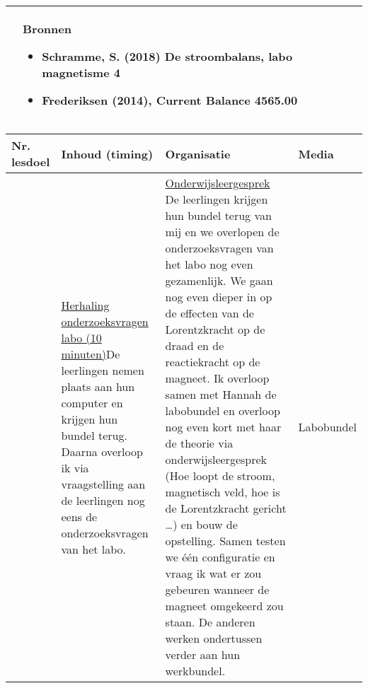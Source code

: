 \begin{landscape}
\begin{tabularx}{1.56\textwidth}{|p{}|X|}
		\\ \cline{2-2}
		  & \textbf{Bronnen}\begin{itemize}
		  	\item Schramme, S. (2018) De stroombalans, labo magnetisme 4
		  	\item Frederiksen (2014), Current Balance 4565.00
		  \end{itemize}\\ \hline
	\end{tabularx}


\newpage
	
	\begin{tabularx}{1.56\textwidth}{|p{1.5cm}|p{9cm}|X|p{4cm}|}
		\hline
		\textbf{Nr. lesdoel } & \textbf{Inhoud (timing)}  & \textbf{Organisatie } & \textbf{Media } \\ \hline
		&\underline{Herhaling onderzoeksvragen} \underline{labo (10 minuten)}\newline De leerlingen nemen plaats aan hun computer en krijgen hun bundel terug. Daarna overloop ik via vraagstelling aan de leerlingen nog eens de onderzoeksvragen van het labo.
		&  \underline{Onderwijsleergesprek}\newline 
			De leerlingen krijgen hun bundel terug van mij en we overlopen de onderzoeksvragen van het labo nog even gezamenlijk. We gaan nog even dieper in op de effecten van de Lorentzkracht op de draad en de reactiekracht op de magneet. \newline\newline Ik overloop samen met Hannah de labobundel en overloop nog even kort met haar de theorie via onderwijsleergesprek (Hoe loopt de stroom, magnetisch veld, hoe is de Lorentzkracht gericht \ldots ) en bouw de opstelling. Samen testen we één configuratie en vraag ik wat er zou gebeuren wanneer de magneet omgekeerd zou staan.  De anderen werken ondertussen verder aan hun werkbundel.
		&  Labobundel
		\\ \hline
	\end{tabularx}\vspace{5mm}


\end{landscape}
